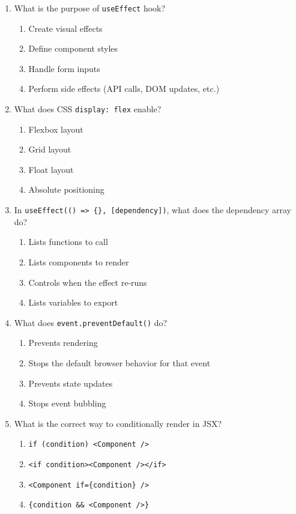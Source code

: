 \documentclass[12pt,a4paper]{article}
\begin{document}
\begin{enumerate}
\item What is the purpose of \texttt{useEffect} hook?
\begin{enumerate}[label=\Alph*)]
    \item Create visual effects
    \item Define component styles
    \item Handle form inputs
    \item Perform side effects (API calls, DOM updates, etc.)
\end{enumerate}

\item What does CSS \texttt{display: flex} enable?
\begin{enumerate}[label=\Alph*)]
    \item Flexbox layout
    \item Grid layout
    \item Float layout
    \item Absolute positioning
\end{enumerate}

\item In \texttt{useEffect(() => \{\}, [dependency])}, what does the dependency array do?
\begin{enumerate}[label=\Alph*)]
    \item Lists functions to call
    \item Lists components to render
    \item Controls when the effect re-runs
    \item Lists variables to export
\end{enumerate}

\item What does \texttt{event.preventDefault()} do?
\begin{enumerate}[label=\Alph*)]
    \item Prevents rendering
    \item Stops the default browser behavior for that event
    \item Prevents state updates
    \item Stops event bubbling
\end{enumerate}

\item What is the correct way to conditionally render in JSX?
\begin{enumerate}[label=\Alph*)]
    \item \texttt{if (condition) <Component />}
    \item \texttt{<if condition><Component /></if>}
    \item \texttt{<Component if=\{condition\} />}
    \item \texttt{\{condition \&\& <Component />\}}
\end{enumerate}


\end{enumerate}
\end{document}
